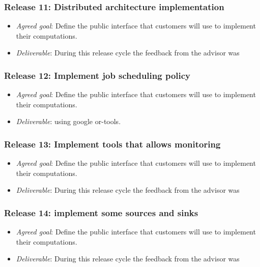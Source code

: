 \subsubsection{Release 11: Distributed architecture implementation}
\begin{itemize}
\item \textit{Agreed goal}: Define the public interface that customers will
  use to implement their computations.
\item \textit{Deliverable}: During this release cycle the feedback from the advisor
  was
\end{itemize}

\subsubsection{Release 12: Implement job scheduling policy}
\begin{itemize}
\item \textit{Agreed goal}: Define the public interface that customers will
  use to implement their computations.
\item \textit{Deliverable}: using google or-tools.
\end{itemize}

\subsubsection{Release 13: Implement tools that allows monitoring}
\begin{itemize}
\item \textit{Agreed goal}: Define the public interface that customers will
  use to implement their computations.
\item \textit{Deliverable}: During this release cycle the feedback from the advisor
  was
\end{itemize}

\subsubsection{Release 14: implement some sources and sinks}
\begin{itemize}
\item \textit{Agreed goal}: Define the public interface that customers will
  use to implement their computations.
\item \textit{Deliverable}: During this release cycle the feedback from the advisor
  was
\end{itemize}

